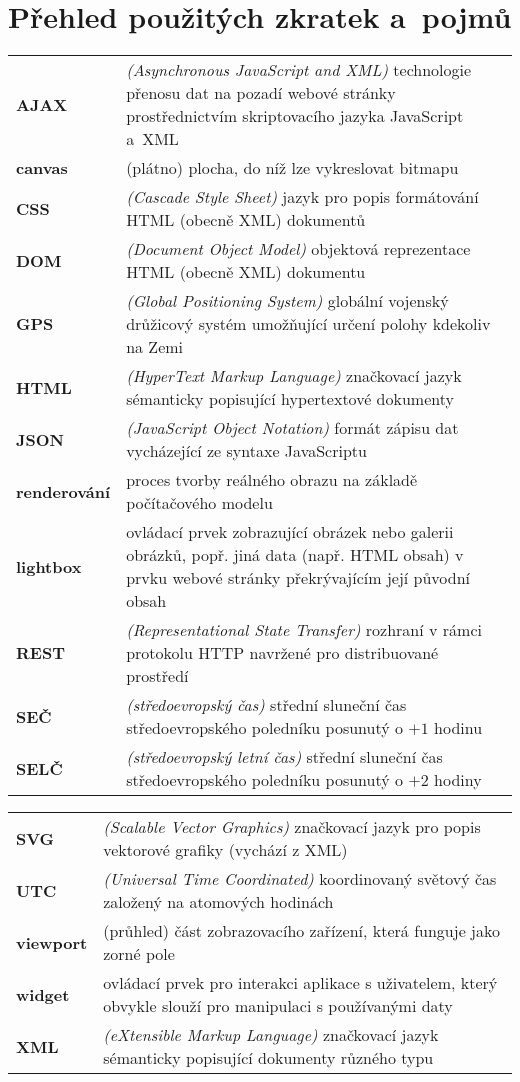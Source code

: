 \chapter*{Přehled použitých zkratek a~pojmů}
    \renewcommand{\arraystretch}{1.5}
    \begin{tabular}{p{}p{}}
    \bf AJAX & \emph{(Asynchronous JavaScript and XML)} technologie přenosu dat na pozadí webové stránky prostřednictvím skriptovacího jazyka JavaScript a~XML \\
	\bf canvas & (plátno) plocha, do níž lze vykreslovat bitmapu\\
    \bf CSS & \emph{(Cascade Style Sheet)} jazyk pro popis formátování HTML (obecně XML) dokumentů\\
    \bf DOM & \emph{(Document Object Model)} objektová reprezentace HTML (obecně XML) dokumentu \\
	\bf GPS & \emph{(Global Positioning System)} globální vojenský drůžicový systém umožňující určení polohy kdekoliv na Zemi \\
    \bf HTML & \emph{(HyperText Markup Language)} značkovací jazyk sémanticky popisující hypertextové dokumenty\\
    \bf JSON & \emph{(JavaScript Object Notation)} formát zápisu dat vycházející ze syntaxe JavaScriptu\\
	\bf renderování & proces tvorby reálného obrazu na základě počítačového modelu\\
	\bf lightbox & ovládací prvek zobrazující obrázek nebo galerii obrázků, popř. jiná data (např. HTML obsah) v prvku webové stránky překrývajícím její původní obsah\\
	\bf REST & \emph{(Representational State Transfer)} rozhraní v rámci protokolu HTTP navržené pro distribuované prostředí \\
    \bf SEČ & \emph{(středoevropský čas)} střední sluneční čas středoevropského poledníku posunutý o $+1$ hodinu\\
    \bf SELČ & \emph{(středoevropský letní čas)} střední sluneční čas středoevropského poledníku posunutý o $+2$ hodiny\\
    \end{tabular}
	\newpage
    \noindent
	\begin{tabular}{p{}p{}}
    \bf SVG & \emph{(Scalable Vector Graphics)} značkovací jazyk pro popis vektorové grafiky (vychází z XML)\\
    \bf UTC & \emph{(Universal Time Coordinated)} koordinovaný světový čas založený na atomových hodinách\\
	\bf viewport & (průhled) část zobrazovacího zařízení, která funguje jako zorné pole\\
    \bf widget & ovládací prvek pro interakci aplikace s uživatelem, který obvykle slouží pro manipulaci s používanými daty\\
    \bf XML & \emph{(eXtensible Markup Language)} značkovací jazyk sémanticky popisující dokumenty různého typu\\
	
    \end{tabular}

